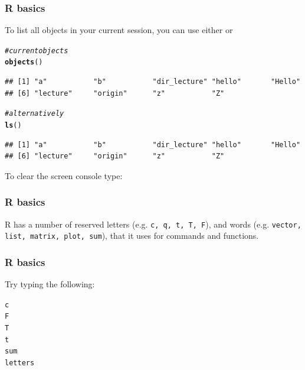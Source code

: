 \documentclass[12pt]{beamer}\usepackage[]{graphicx}\usepackage[]{color}
\makeatletter
\newcommand{\hlcom}[1]{\textcolor[rgb]{0.678,0.584,0.686}{\textit{#1}}}%
\newcommand{\hlstd}[1]{\textcolor[rgb]{0.345,0.345,0.345}{#1}}%
\newcommand{\hlkwd}[1]{\textcolor[rgb]{0.737,0.353,0.396}{\textbf{#1}}}%
\newenvironment{kframe}{%
 \def\at@end@of@kframe{}%
 \ifinner\ifhmode%
  \def\at@end@of@kframe{\end{minipage}}%
  \begin{minipage}{\columnwidth}%
 \fi\fi%
 \def\FrameCommand##1{\hskip\@totalleftmargin \hskip-\fboxsep
 \colorbox{shadecolor}{##1}\hskip-\fboxsep
     \hskip-\linewidth \hskip-\@totalleftmargin \hskip\columnwidth}%
 \MakeFramed {\advance\hsize-\width
   \@totalleftmargin\z@ \linewidth\hsize
   \@setminipage}}%
 {\par\unskip\endMakeFramed%
 \at@end@of@kframe}
\newenvironment{knitrout}{}{} %
\makeatother
\begin{document}

\begin{frame}[fragile]
\frametitle{R basics}

To list all objects in your current session, you can use either  or 
\begin{knitrout}\footnotesize
{}\color{fgcolor}\begin{kframe}
\begin{alltt}
\hlcom{# current objects}
\hlkwd{objects}\hlstd{()}
\end{alltt}
\begin{verbatim}
## [1] "a"           "b"           "dir_lecture" "hello"       "Hello"      
## [6] "lecture"     "origin"      "z"           "Z"
\end{verbatim}
\begin{alltt}
\hlcom{# alternatively}
\hlkwd{ls}\hlstd{()}
\end{alltt}
\begin{verbatim}
## [1] "a"           "b"           "dir_lecture" "hello"       "Hello"      
## [6] "lecture"     "origin"      "z"           "Z"
\end{verbatim}
\end{kframe}
\end{knitrout}

To clear the screen console type: 

\end{frame}


\begin{frame}
\frametitle{R basics}

R has a number of reserved letters (e.g. \texttt{c, q, t, T, F}), and words (e.g. \texttt{vector, list, matrix, plot, sum}), that it uses for commands and functions.
\eb

\end{frame}


\begin{frame}[fragile]
\frametitle{R basics}

Try typing the following:
\begin{knitrout}\footnotesize
{}\color{fgcolor}\begin{kframe}
\begin{alltt}
\hlstd{c}
\hlstd{F}
\hlstd{T}
\hlstd{t}
\hlstd{sum}
\hlstd{letters}
\end{alltt}
\end{kframe}
\end{knitrout}

\end{frame}
\end{document}
